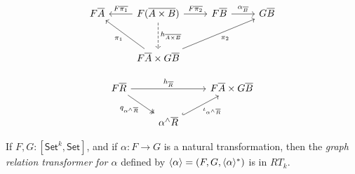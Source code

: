 \documentclass[runningheads]{llncs}
\newcommand{\set}{\mathsf{Set}}
\begin{document}
\begin{figure*}[ht]
\vspace*{-0.3in}
  \begin{minipage}[b]{0.25\linewidth}
{\footnotesize\[\begin{tikzcd}[row sep = large]
        F\overline{A}
        &F(\overline{A \times B})
        \ar[l, "{F\overline{\pi_1}}"']
        \ar[r, "{F\overline{\pi_2}}"]
        \ar[d, dashed, "{h_{\overline{A \times B}}}"]
        &F\overline{B}
        \ar[r, "{\alpha_{\ol{B}}}"]
        &G\overline{B} \\
        &F\overline{A} \times G\overline{B}
        \ar[ul, "{\pi_1}"] \ar[urr, "{\pi_2}"']
\end{tikzcd}\]}
  \end{minipage}
  \hspace*{1.4in}
  \begin{minipage}[b]{0.5\linewidth}
{\footnotesize\[\begin{tikzcd}
        F\overline{R}
        \ar[rr, "{h_{\overline{R}}}"]
        \ar[dr, twoheadrightarrow, "{q_{\alpha^\wedge\overline{R}}}"']
        &&F\overline{A} \times G\overline{B} \\
        &\alpha^\wedge\overline{R}
        \ar[ur, hookrightarrow, "{\iota_{\alpha^\wedge\overline{R}}}"']
\end{tikzcd}\]}
\end{minipage}\vspace*{-0.4in}
\end{figure*}


\begin{lemma}\label{lem:graph-reln-functors}
If $F,G : [\set^k,\set]$, and if $\alpha : F \to G$ is a natural
transformation, then the {\em graph relation transformer for $\alpha$}
defined by $\langle {\alpha} \rangle = (F, G, \langle {\alpha} \rangle^*)$ is in $RT_k$.
\end{lemma}
\end{document}

